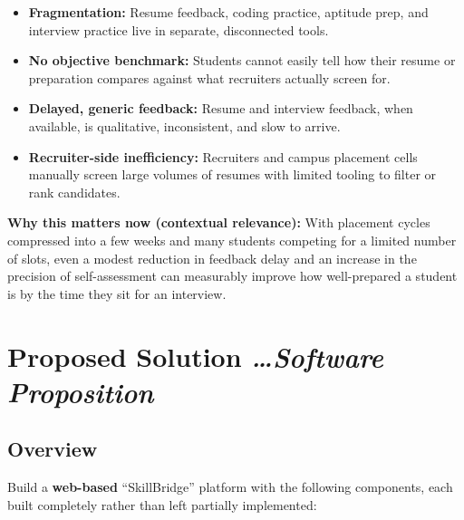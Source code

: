\documentclass[11pt,a4paper]{article}
\newcommand{\BvrHint}[1]{%
  {\normalfont\normalsize\itshape\hfill #1}}
\begin{document}
\begin{itemize}[leftmargin=0.7cm]
    \item \textbf{Fragmentation:} Resume feedback, coding practice, aptitude prep, and interview practice live in separate, disconnected tools.
    \item \textbf{No objective benchmark:} Students cannot easily tell how their resume or preparation compares against
     what recruiters actually screen for.
    \item \textbf{Delayed, generic feedback:} Resume and interview feedback, when available, is qualitative, inconsistent, and slow to arrive.
    \item \textbf{Recruiter-side inefficiency:} Recruiters and campus placement cells manually screen large volumes of
    resumes with limited tooling to filter or rank candidates.
\end{itemize}

\textbf{Why this matters now (contextual relevance):} With placement cycles compressed into a few weeks and many students competing for  a limited number of slots, even a modest reduction in feedback delay and an increase in the precision of self-assessment can  measurably improve how well-prepared a student is by the time they sit for an interview.

\section{Proposed Solution %
\BvrHint{\ldots Software Proposition}}
\subsection{Overview}
Build a \textbf{web-based} “SkillBridge” platform with the following components, each built completely rather
than left partially implemented:
\end{document}
